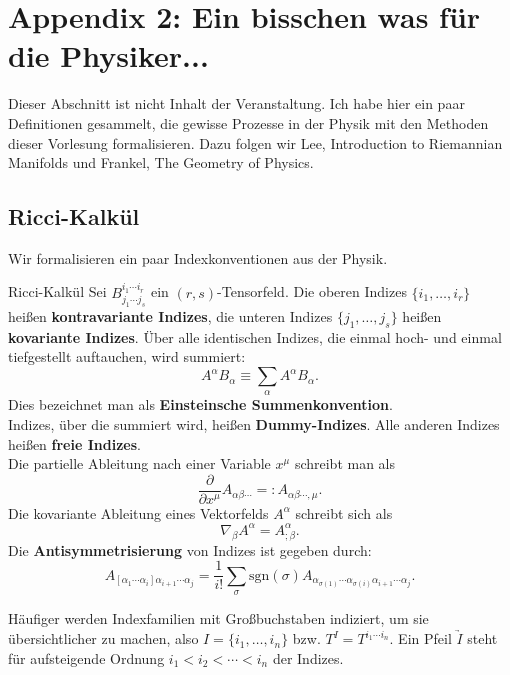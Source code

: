 \section{Appendix 2: Ein bisschen was für die Physiker...}
\label{ch:physik}
Dieser Abschnitt ist nicht Inhalt der Veranstaltung. Ich habe hier ein paar Definitionen gesammelt, die gewisse Prozesse in der Physik mit den Methoden dieser Vorlesung formalisieren. Dazu folgen wir Lee, Introduction to Riemannian Manifolds und Frankel, The Geometry of Physics.
\subsection{Ricci-Kalkül}
Wir formalisieren ein paar Indexkonventionen aus der Physik.
\begin{definition}{Ricci-Kalkül}
Sei $B^{i_1 \cdots i_r}_{j_1 \cdots j_s}$ ein $(r,s)$-Tensorfeld. Die oberen Indizes $\{i_1, \dots, i_r\}$ heißen \textbf{kontravariante Indizes}, die unteren Indizes $\{j_1, \dots, j_s \}$ heißen \textbf{kovariante Indizes}. Über alle identischen Indizes, die einmal hoch- und einmal tiefgestellt auftauchen, wird summiert:
\begin{equation}
A^\alpha B_\alpha \equiv \sum_\alpha A^\alpha B_\alpha.
\end{equation}
Dies bezeichnet man als \textbf{Einsteinsche Summenkonvention}.\\
Indizes, über die summiert wird, heißen \textbf{Dummy-Indizes}. Alle anderen Indizes heißen \textbf{freie Indizes}.\\
Die partielle Ableitung nach einer Variable $x^\mu$ schreibt man als
\begin{equation}
\frac{\partial}{\partial x^\mu} A_{\alpha \beta \cdots} =: A_{\alpha \beta \cdots, \mu}.
\end{equation}
Die kovariante Ableitung eines Vektorfelds $A^\alpha$ schreibt sich als
\begin{equation}
\nabla_\beta A^\alpha = A^\alpha_{;\beta}.
\end{equation}
Die \textbf{Antisymmetrisierung} von Indizes ist gegeben durch:
\begin{equation}
A_{[\alpha_1 \cdots \alpha_i]\alpha_{i+1} \cdots \alpha_j} = \frac{1}{i!} \sum_\sigma \text{sgn}(\sigma) A_{\alpha_{\sigma(1)} \cdots \alpha_{\sigma(i)} \alpha_{i+1} \cdots \alpha_j}.
\end{equation}
\end{definition}
\begin{bemerkung}
Häufiger werden Indexfamilien mit Großbuchstaben indiziert, um sie übersichtlicher zu machen, also $I = \{i_1, \dots, i_n\}$ bzw. $T^I = T^{i_1 \cdots i_n}$. Ein Pfeil $\underrightarrow{I}$ steht für aufsteigende Ordnung $i_1 < i_2 < \cdots < i_n$ der Indizes.
\end{bemerkung}
